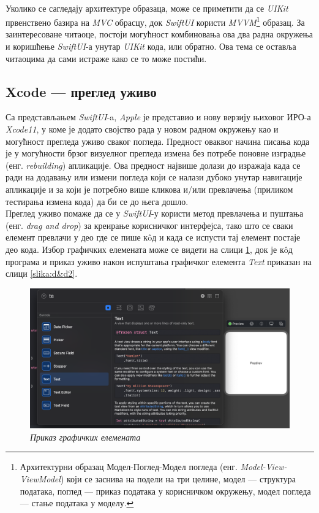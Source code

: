 \documentclass[12pt,oneside]{memoir}
\begin{document}
\\
\indent Уколико се сагледају архитектуре образаца, може се приметити да се \textit{UIKit} првенствено базира на \textit{MVC} обрасцу, док \textit{SwiftUI} користи \textit{MVVM}\footnote{Архитектурни образац Модел-Поглед-Модел погледа (енг. \textit{Model-View-ViewModel}) који се заснива на подели на три целине, модел --- структура података, поглед --- приказ података у корисничком окружењу, модел погледа --- стање података у моделу.} образац. За заинтересоване читаоце, постоји могућност комбиновања ова два радна окружења и коришћење \textit{SwiftUI}-а унутар \textit{UIKit} кода, или обратно. Ова тема се оставља читаоцима да сами истраже како се то може постићи.

\subsection{Xcode --- преглед уживо}
\label{subsec:Xcode - преглед уживо}

\indent Са представљањем \textit{SwiftUI}-a, \textit{Apple} је представио и нову верзију њиховог ИРО-а \textit{Xcode11}, у коме је додато својство рада у новом радном окружењу као и могућност прегледа уживо сваког погледа. Предност оваквог начина писања кода је у могућности брзог визуелног прегледа измена без потребе поновне изградње (енг. \textit{rebuilding}) апликације. Ова предност највише долази до изражаја када се ради на додавању или измени погледа који се налази дубоко унутар навигације апликације и за који је потребно више кликова и/или превлачења (приликом тестирања измена кода) да би се до њега дошло. 
\\
\indent Преглед уживо помаже да се у \textit{SwiftUI}-у користи метод превлачења и пуштања (енг. \textit{drag and drop}) за креирање корисничког интерфејса, тако што се сваки елемент превлачи у део где се пише к\^{o}д и када се испусти тај елемент постаје део кода. Избор графичких елемената може се видети на слици \ref{slika:d&d1}, док је к\^{o}д програма и приказ уживо након испуштања графичког елемента \textit{Text} приказан на слици \ref{slika:d&d2}.

\begin{figure}[H]
\includegraphics[width=1\textwidth]{images/Drag_and_drop_1.png}
\centering
\caption{\textit{Приказ графичких елемената}}
\label{slika:d&d1}
\end{figure}
\end{document}
